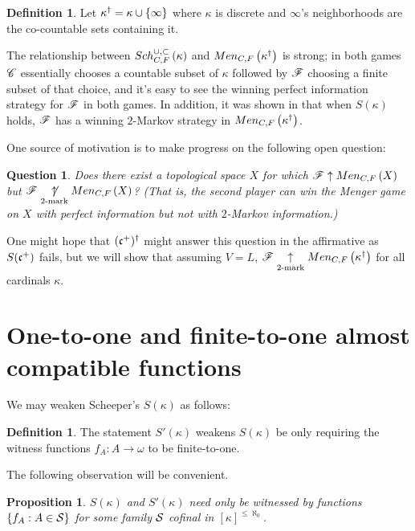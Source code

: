 \documentclass{amsart}
\theoremstyle{plain}
\newtheorem{proposition}[theorem]{Proposition}
\newtheorem{question}[theorem]{Question}
\theoremstyle{definition}
\newtheorem{definition}[theorem]{Definition}
\theoremstyle{remark}
\theoremstyle{plain}
\theoremstyle{definition}
\theoremstyle{remark}
\begin{document}
  \begin{definition}
    Let \(\kappa^\dagger=\kappa\cup\{\infty\}\) where \(\kappa\) is
    discrete and \(\infty\)'s neighborhoods are the co-countable sets
    containing it.
  \end{definition}

  The relationship between \(Sch^{\cup,\subset}_{C,F}\left({\kappa}\right)\) and
  \(Men_{C,F}\left({\kappa^\dagger}\right)\) is strong; in both games \(\mathscr{C}\) essentially
  chooses a countable subset of \(\kappa\) followed by \(\mathscr{F}\) choosing
  a finite subset of that choice, and it's easy to see the winning perfect
  information strategy for \(\mathscr{F}\) in both games.
  In addition, it was shown in
  \cite{clontzMengerGamePreprint} that when \(S(\kappa)\) holds,
  \(\mathscr{F}\) has a winning \(2\)-Markov strategy in
  \(Men_{C,F}\left({\kappa^\dagger}\right)\).

  One source of motivation is to make progress on the following open question:

  \begin{question}
    Does there exist a topological space \(X\) for which
    \(\mathscr{F}\uparrow Men_{C,F}\left({X}\right)\) but \(\mathscr{F}\underset{2\text{-mark}}{\not\uparrow}Men_{C,F}\left({X}\right)\)?
    (That is, the second player can win the Menger game on \(X\)
    with perfect information but not with \(2\)-Markov information.)
  \end{question}

  One might hope that \((\mathfrak{c}^+)^\dagger\) might answer this question
  in the affirmative as \(S(\mathfrak{c}^+)\) fails, but we will show that assuming
  \(V=L\), \(\mathscr{F}\underset{2\text{-mark}}{\uparrow}Men_{C,F}\left({\kappa^\dagger}\right)\) for all
  cardinals \(\kappa\).

  \section{One-to-one and finite-to-one almost compatible functions}

  We may weaken Scheeper's \(S(\kappa)\) as follows:

  \begin{definition}
    The statement \(S'(\kappa)\) weakens \(S(\kappa)\) be only requiring
    the witness functions \(f_A:A\to\omega\) to be finite-to-one.
  \end{definition}

  The following observation will be convenient.

  \begin{proposition}
    \(S(\kappa)\) and \(S'(\kappa)\) need only be witnessed by
    functions \(\{f_A:A\in\mathcal{S}\}\) for some family \(\mathcal{S}\)
    cofinal in \([\kappa]^{\leq\aleph_0}\).
  \end{proposition}
\end{document}
